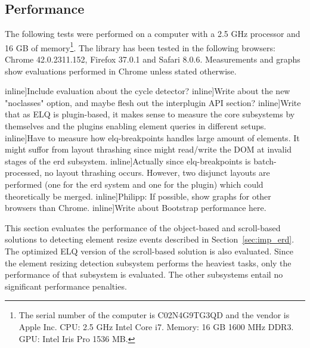 \documentclass{acm_proc_article-sp}
\newcommand{\code}[1]{\texttt{#1}}
\newcommand{\gls}[1]{#1}
\newcommand{\todo}[1]{}
\begin{document}
  \subsection{Performance}
    The following tests were performed on a computer with a 2.5 GHz processor and 16 GB of memory\footnote{The serial number of the computer is C02N4G9TG3QD and the vendor is Apple Inc. CPU: 2.5 GHz Intel Core i7. Memory: 16 GB 1600 MHz DDR3. GPU: Intel Iris Pro 1536 MB.}.
    The library has been tested in the following browsers: Chrome 42.0.2311.152, Firefox 37.0.1 and Safari 8.0.6.
    Measurements and graphs show evaluations performed in Chrome unless stated otherwise.


    \todo[inline]{Include evaluation about the cycle detector?}
    \todo[inline]{Write about the new "noclasses" option, and maybe flesh out the interplugin API section?}
    \todo[inline]{Write that as ELQ is plugin-based, it makes sense to measure the core subsystems by themselves and the plugins enabling element queries in different setups.}
    \todo[inline]{Have to measure how elq-breakpoints handles large amount of elements. It might suffor from layout thrashing since might read/write the DOM at invalid stages of the erd subsystem.}
    \todo[inline]{Actually since elq-breakpoints is batch-processed, no layout thrashing occurs. However, two disjunct layouts are performed (one for the erd system and one for the plugin) which could theoretically be merged.}
    \todo[inline]{Philipp: If possible, show graphs for other browsers than Chrome.}
    \todo[inline]{Write about Bootstrap performance here.}

    
      This section evaluates the performance of the object-based and scroll-based solutions to detecting \gls{element} resize events described in Section~\ref{sec:imp_erd}.
      The optimized \gls{ELQ} version of the scroll-based solution is also evaluated.
      Since the element resizing detection subsystem performs the heaviest tasks, only the performance of that subsystem is evaluated.
      The other subsystems entail no significant performance penalties.
      \todo{Remove this, and analyze the different subsystems in detail: erd, cycle detector, elq-breakpoints, etc.}
\end{document}

